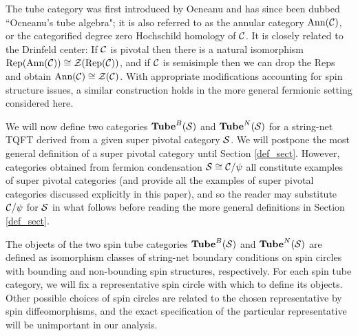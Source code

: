 The tube category was first introduced by Ocneanu \cite{ocneanu1994} and has since 
been dubbed ``Ocneanu's tube algebra"; it is also referred to as the annular category $\text{Ann}(\mathcal{C})$, 
or the categorified degree zero Hochschild homology of $\mathcal{C}$.
It is closely related to the Drinfeld center:
If $\mathcal{C}$ is pivotal then there is a natural isomorphism
$\text{Rep}(\text{Ann}(\mathcal{C})) \cong \mathcal{Z}(\text{Rep}(\mathcal{C}))$, and if $\mathcal{C}$ is semisimple then we can drop
the $\text{Rep}$s and obtain $\text{Ann}(\mathcal{C}) \cong \mathcal{Z}(\mathcal{C})$.
With appropriate modifications accounting for spin structure issues, a similar construction holds 
in the more general fermionic setting considered here. 


\medskip
We will now define two categories $\textbf{Tube}^B(\mathcal{S})$ and $\textbf{Tube}^N(\mathcal{S})$ for a string-net TQFT derived from a given super pivotal category $\mathcal{S}$. 
We will postpone the most general definition of a super pivotal category until Section \ref{def_sect}. 
However, categories
obtained from fermion condensation $\mathcal{S} \cong \mathcal{C} / \psi$ all constitute examples of super pivotal categories (and provide all the examples of super pivotal categories discussed explicitly in this paper), 
and so the reader may substitute $\mathcal{C}/\psi$ for $\mathcal{S}$ in what follows before reading the more 
general definitions in Section \ref{def_sect}. 

The objects of the two spin tube categories $\textbf{Tube}^B(\mathcal{S})$ and $\textbf{Tube}^N(\mathcal{S})$ are defined as isomorphism classes of 
string-net boundary conditions on spin circles with bounding 
and non-bounding spin structures, respectively. 
For each spin tube category, we will fix a representative spin circle with which to define its
objects. 
Other possible choices of spin circles are related to the chosen representative
by spin diffeomorphisms, and the exact specification of the particular representative will 
be unimportant in our analysis. 

